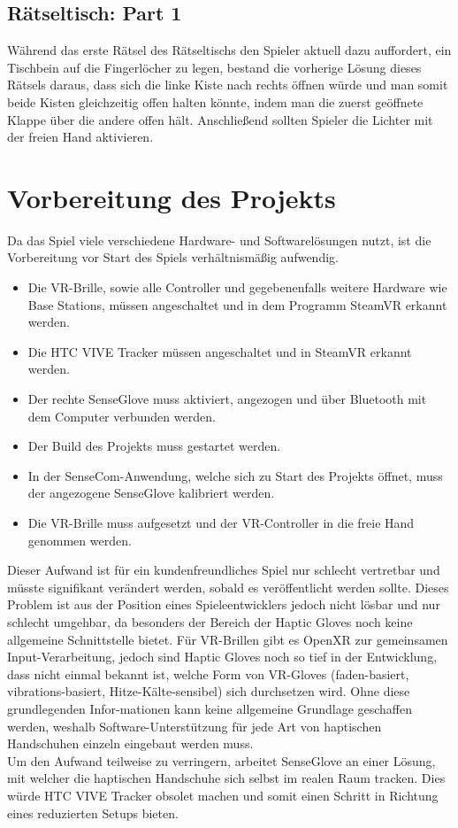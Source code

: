 \subsection{Rätseltisch: Part 1}
Während das erste Rätsel des Rätseltischs den Spieler aktuell dazu auffordert, ein Tischbein auf die Fingerlöcher zu legen, bestand die vorherige Lösung dieses Rätsels daraus, dass sich die linke Kiste nach rechts öffnen würde und man somit beide Kisten gleichzeitig offen halten könnte, indem man die zuerst geöffnete Klappe über die andere offen hält. Anschließend sollten Spieler die Lichter mit der freien Hand aktivieren. 

\newpage
\noindent
\section{Vorbereitung des Projekts}
Da das Spiel viele verschiedene Hardware- und Softwarelösungen nutzt, ist die Vorbereitung vor Start des Spiels verhältnismäßig aufwendig.

\begin{itemize}
	\item Die VR-Brille, sowie alle Controller und gegebenenfalls weitere Hardware wie \dq Base Stations\dq, müssen angeschaltet und in dem Programm SteamVR erkannt werden.
	\item Die HTC VIVE Tracker müssen angeschaltet und in SteamVR erkannt werden.
	\item Der rechte SenseGlove muss aktiviert, angezogen und über Bluetooth mit dem Computer verbunden werden.
	\item Der Build des Projekts muss gestartet werden.
	\item In der SenseCom-Anwendung, welche sich zu Start des Projekts öffnet, muss der angezogene SenseGlove kalibriert werden.
	\item Die VR-Brille muss aufgesetzt und der VR-Controller in die freie Hand genommen werden.
\end{itemize}
\noindent Dieser Aufwand ist für ein kundenfreundliches Spiel nur schlecht vertretbar und müsste signifikant verändert werden, sobald es veröffentlicht werden sollte. Dieses Problem ist aus der Position eines Spieleentwicklers jedoch nicht lösbar und nur schlecht umgehbar, da besonders der Bereich der Haptic Gloves noch keine allgemeine Schnittstelle bietet. Für VR-Brillen gibt es OpenXR zur gemeinsamen Input-Verarbeitung, jedoch sind Haptic Gloves noch so tief in der Entwicklung, dass nicht einmal bekannt ist, welche Form von VR-Gloves (faden-basiert, vibrations-basiert, Hitze-Kälte-sensibel) sich durchsetzen wird. Ohne diese grundlegenden Infor-mationen kann keine allgemeine Grundlage geschaffen werden, weshalb Software-Unterstützung für jede Art von haptischen Handschuhen einzeln eingebaut werden muss.\\
\noindent Um den Aufwand teilweise zu verringern, arbeitet SenseGlove an einer Lösung, mit welcher die haptischen Handschuhe sich selbst im realen Raum tracken. Dies würde HTC VIVE Tracker obsolet machen und somit einen Schritt in Richtung eines reduzierten Setups bieten.


